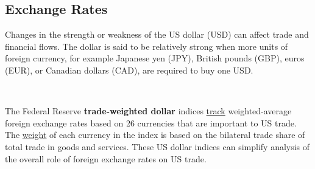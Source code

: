 \subsection*{Exchange Rates}
\begin{minipage}{0.76\textwidth}
       
\small Changes in the strength or weakness of the US dollar (USD) can affect trade and financial flows. The dollar is said to be relatively strong when more units of foreign currency, for example Japanese yen (JPY), British pounds (GBP), euros (EUR), or Canadian dollars (CAD), are required to buy one USD.


\vspace{0.5mm}

\\
\vspace{4mm} 

\small The Federal Reserve \textbf{trade-weighted dollar} indices \href{https://www.federalreserve.gov/releases/h10/summary/default.htm}{track} weighted-average foreign exchange rates based on 26 currencies that are important to US trade. The \href{https://www.federalreserve.gov/releases/h10/weights/default.htm}{weight} of each currency in the index is based on the bilateral trade share of total trade in goods and services. These US dollar indices can simplify analysis of the overall role of foreign exchange rates on US trade. 
\end{minipage}

